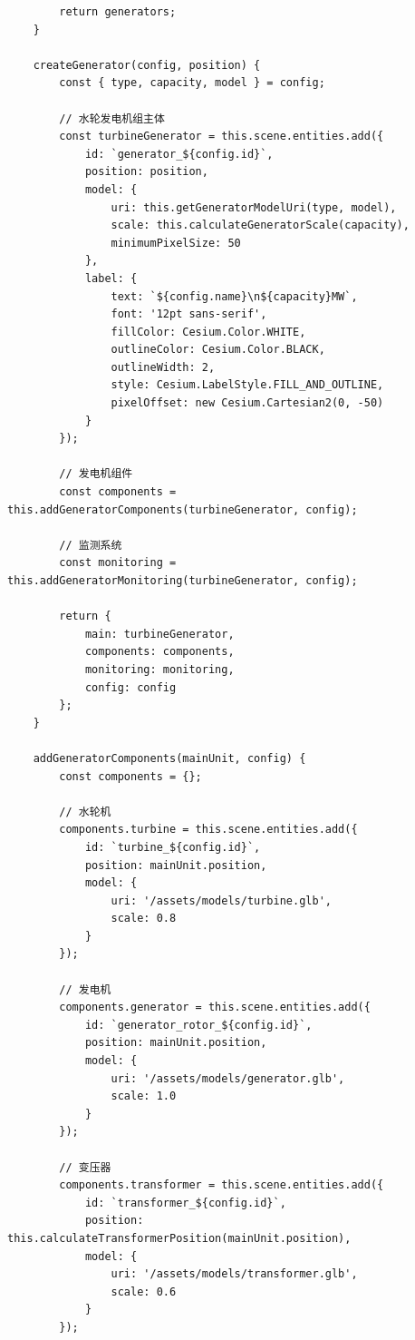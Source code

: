\begin{lstlisting}
        return generators;
    }
    
    createGenerator(config, position) {
        const { type, capacity, model } = config;
        
        // 水轮发电机组主体
        const turbineGenerator = this.scene.entities.add({
            id: `generator_${config.id}`,
            position: position,
            model: {
                uri: this.getGeneratorModelUri(type, model),
                scale: this.calculateGeneratorScale(capacity),
                minimumPixelSize: 50
            },
            label: {
                text: `${config.name}\n${capacity}MW`,
                font: '12pt sans-serif',
                fillColor: Cesium.Color.WHITE,
                outlineColor: Cesium.Color.BLACK,
                outlineWidth: 2,
                style: Cesium.LabelStyle.FILL_AND_OUTLINE,
                pixelOffset: new Cesium.Cartesian2(0, -50)
            }
        });
        
        // 发电机组件
        const components = this.addGeneratorComponents(turbineGenerator, config);
        
        // 监测系统
        const monitoring = this.addGeneratorMonitoring(turbineGenerator, config);
        
        return {
            main: turbineGenerator,
            components: components,
            monitoring: monitoring,
            config: config
        };
    }
    
    addGeneratorComponents(mainUnit, config) {
        const components = {};
        
        // 水轮机
        components.turbine = this.scene.entities.add({
            id: `turbine_${config.id}`,
            position: mainUnit.position,
            model: {
                uri: '/assets/models/turbine.glb',
                scale: 0.8
            }
        });
        
        // 发电机
        components.generator = this.scene.entities.add({
            id: `generator_rotor_${config.id}`,
            position: mainUnit.position,
            model: {
                uri: '/assets/models/generator.glb',
                scale: 1.0
            }
        });
        
        // 变压器
        components.transformer = this.scene.entities.add({
            id: `transformer_${config.id}`,
            position: this.calculateTransformerPosition(mainUnit.position),
            model: {
                uri: '/assets/models/transformer.glb',
                scale: 0.6
            }
        });
        

\end{lstlisting}
